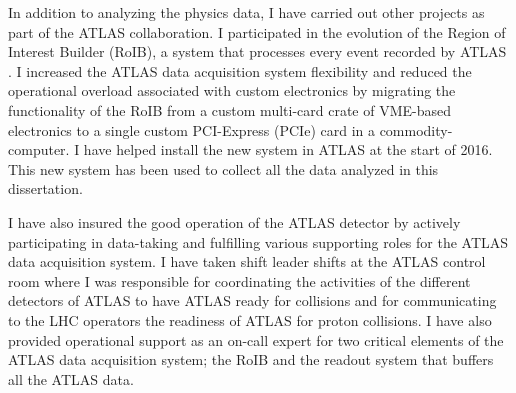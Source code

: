 In addition to analyzing the physics data, I have carried out other projects as part of the ATLAS collaboration.
I participated in the evolution of the Region of Interest Builder (RoIB), a system that processes 
every event recorded by ATLAS \cite{pcroib_orifki}. 
I increased the ATLAS data acquisition system flexibility and reduced the operational overload associated 
with custom electronics 
by migrating the functionality of the RoIB from a custom multi-card crate of VME-based electronics to a single custom PCI-Express 
(PCIe) card in a commodity-computer. I have helped install the new system in ATLAS at the start of 2016.
This new system has been used to collect all the data analyzed in this dissertation.

I have also insured the good operation of the ATLAS detector by actively participating in data-taking and fulfilling various 
supporting roles for the ATLAS data acquisition system. I have taken shift leader shifts at the ATLAS control room 
where I was responsible for coordinating the activities of the different detectors of ATLAS to have ATLAS ready for collisions
and for communicating to the LHC operators the readiness of ATLAS for 
proton collisions.
I have also provided 
operational support as an on-call expert for two critical elements of the ATLAS data acquisition system; the RoIB and 
the readout system that buffers all the ATLAS data.

